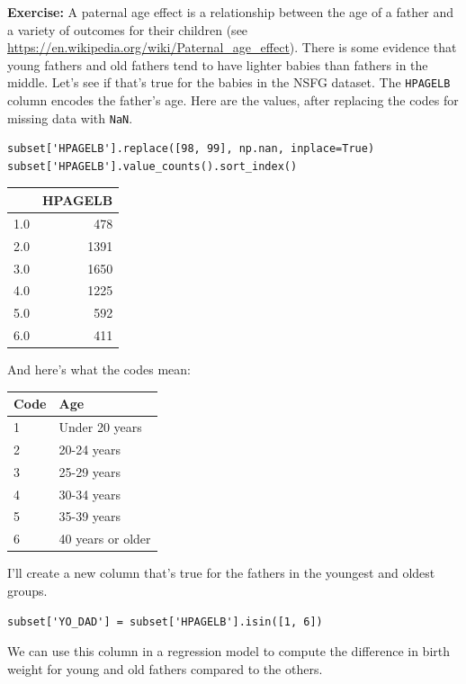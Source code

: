\textbf{Exercise:} A paternal age effect is a relationship between the
age of a father and a variety of outcomes for their children (see
\url{https://en.wikipedia.org/wiki/Paternal_age_effect}). There is some
evidence that young fathers and old fathers tend to have lighter babies
than fathers in the middle. Let's see if that's true for the babies in
the NSFG dataset. The \passthrough{\lstinline!HPAGELB!} column encodes
the father's age. Here are the values, after replacing the codes for
missing data with \passthrough{\lstinline!NaN!}.

\begin{lstlisting}[]
subset['HPAGELB'].replace([98, 99], np.nan, inplace=True)
subset['HPAGELB'].value_counts().sort_index()
\end{lstlisting}

\begin{tabular}{lr}
\midrule
{} &  HPAGELB \\
\midrule
1.0 &      478 \\
2.0 &     1391 \\
3.0 &     1650 \\
4.0 &     1225 \\
5.0 &      592 \\
6.0 &      411 \\
\midrule
\end{tabular}

And here's what the codes mean:

\begin{longtable}[]{@{}ll@{}}
\midrule()
Code & Age \\
\midrule()
\endhead
1 & Under 20 years \\
2 & 20-24 years \\
3 & 25-29 years \\
4 & 30-34 years \\
5 & 35-39 years \\
6 & 40 years or older \\
\midrule()
\end{longtable}

I'll create a new column that's true for the fathers in the youngest and
oldest groups.

\begin{lstlisting}[]
subset['YO_DAD'] = subset['HPAGELB'].isin([1, 6])
\end{lstlisting}

We can use this column in a regression model to compute the difference
in birth weight for young and old fathers compared to the others.

